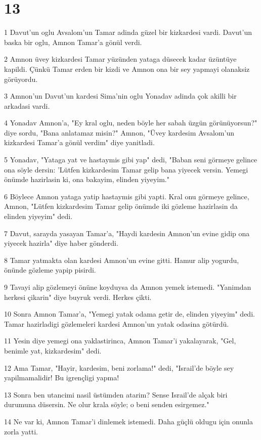 \chapter{13}

\par 1 Davut'un oglu Avsalom'un Tamar adinda güzel bir kizkardesi vardi. Davut'un baska bir oglu, Amnon Tamar'a gönül verdi.
\par 2 Amnon üvey kizkardesi Tamar yüzünden yataga düsecek kadar üzüntüye kapildi. Çünkü Tamar erden bir kizdi ve Amnon ona bir sey yapmayi olanaksiz görüyordu.
\par 3 Amnon'un Davut'un kardesi Sima'nin oglu Yonadav adinda çok akilli bir arkadasi vardi.
\par 4 Yonadav Amnon'a, "Ey kral oglu, neden böyle her sabah üzgün görünüyorsun?" diye sordu, "Bana anlatamaz misin?" Amnon, "Üvey kardesim Avsalom'un kizkardesi Tamar'a gönül verdim" diye yanitladi.
\par 5 Yonadav, "Yataga yat ve hastaymis gibi yap" dedi, "Baban seni görmeye gelince ona söyle dersin: 'Lütfen kizkardesim Tamar gelip bana yiyecek versin. Yemegi önümde hazirlasin ki, ona bakayim, elinden yiyeyim."
\par 6 Böylece Amnon yataga yatip hastaymis gibi yapti. Kral onu görmeye gelince, Amnon, "Lütfen kizkardesim Tamar gelip önümde iki gözleme hazirlasin da elinden yiyeyim" dedi.
\par 7 Davut, sarayda yasayan Tamar'a, "Haydi kardesin Amnon'un evine gidip ona yiyecek hazirla" diye haber gönderdi.
\par 8 Tamar yatmakta olan kardesi Amnon'un evine gitti. Hamur alip yogurdu, önünde gözleme yapip pisirdi.
\par 9 Tavayi alip gözlemeyi önüne koyduysa da Amnon yemek istemedi. "Yanimdan herkesi çikarin" diye buyruk verdi. Herkes çikti.
\par 10 Sonra Amnon Tamar'a, "Yemegi yatak odama getir de, elinden yiyeyim" dedi. Tamar hazirladigi gözlemeleri kardesi Amnon'un yatak odasina götürdü.
\par 11 Yesin diye yemegi ona yaklastirinca, Amnon Tamar'i yakalayarak, "Gel, benimle yat, kizkardesim" dedi.
\par 12 Ama Tamar, "Hayir, kardesim, beni zorlama!" dedi, "Israil'de böyle sey yapilmamalidir! Bu igrençligi yapma!
\par 13 Sonra ben utancimi nasil üstümden atarim? Sense Israil'de alçak biri durumuna düsersin. Ne olur krala söyle; o beni senden esirgemez."
\par 14 Ne var ki, Amnon Tamar'i dinlemek istemedi. Daha güçlü oldugu için onunla zorla yatti.
